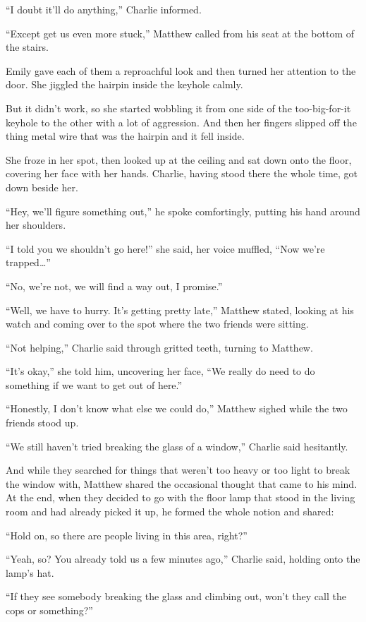 “I doubt it'll do anything,” Charlie informed.

“Except get us even more stuck,” Matthew called from his seat at the bottom of the stairs.

Emily gave each of them a reproachful look and then turned her attention to the door. She jiggled the hairpin inside the keyhole calmly.

But it didn't work, so she started wobbling it from one side of the too-big-for-it keyhole to the other with a lot of aggression. And then her fingers slipped off the thing metal wire that was the hairpin and it fell inside.

She froze in her spot, then looked up at the ceiling and sat down onto the floor, covering her face with her hands. Charlie, having stood there the whole time, got down beside her.

“Hey, we'll figure something out,” he spoke comfortingly, putting his hand around her shoulders.

“I told you we shouldn't go here!” she said, her voice muffled, “Now we're trapped…”

“No, we're not, we will find a way out, I promise.”

“Well, we have to hurry. It's getting pretty late,” Matthew stated, looking at his watch and coming over to the spot where the two friends were sitting.

“Not helping,” Charlie said through gritted teeth, turning to Matthew.

“It's okay,” she told him, uncovering her face, “We really do need to do something if we want to get out of here.”

“Honestly, I don't know what else we could do,” Matthew sighed while the two friends stood up.

“We still haven't tried breaking the glass of a window,” Charlie said hesitantly.

And while they searched for things that weren't too heavy or too light to break the window with, Matthew shared the occasional thought that came to his mind. At the end, when they decided to go with the floor lamp that stood in the living room and had already picked it up, he formed the whole notion and shared:

“Hold on, so there are people living in this area, right?”

“Yeah, so? You already told us a few minutes ago,” Charlie said, holding onto the lamp's hat.

“If they see somebody breaking the glass and climbing out, won't they call the cops or something?”

